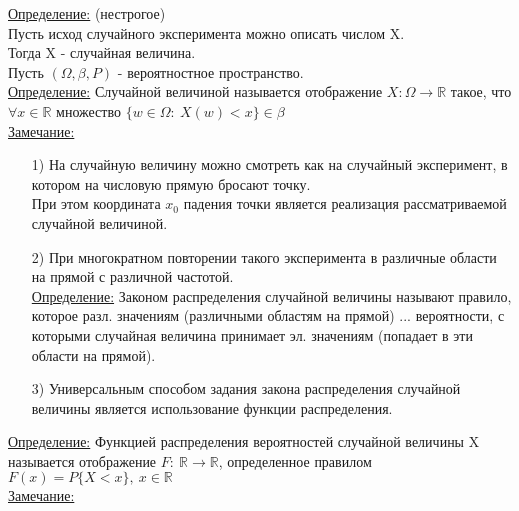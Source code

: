 
\underline{Определение:} (нестрогое) \\
Пусть исход случайного эксперимента можно описать числом X. \\
Тогда X - случайная величина. \\


Пусть $(\Omega, \beta, P)$ - вероятностное пространство. \\
\underline{Определение:} Случайной величиной называется отображение $X: \Omega \to \mathbb{R}$ такое, что $\forall x \in \mathbb{R}$ множество $\{w \in \Omega: \ X(w) < x\} \in \beta$ \\ %

\underline{Замечание:} 
\begin{enumerate}
\item[1)] На случайную величину можно смотреть как на случайный эксперимент, в котором на числовую прямую бросают точку. \\
При этом координата $x_0$ падения точки является реализация рассматриваемой случайной величиной.

\item[2)] При многократном повторении такого эксперимента в различные области на прямой с различной частотой. \\
\underline{Определение:} Законом распределения случайной величины называют правило, которое разл. значениям (различными областям на прямой) ... вероятности, с которыми случайная величина принимает эл. значениям (попадает в эти области на прямой).

\item[3)] Универсальным способом задания закона распределения случайной величины является использование функции распределения.
\end{enumerate}


\underline{Определение:} Функцией распределения вероятностей случайной величины X называется отображение $F: \ \mathbb{R} \to \mathbb{R}$, определенное правилом $F(x) = P\{X < x\}, \ x \in \mathbb{R}$ \\

\underline{Замечание:} \\


